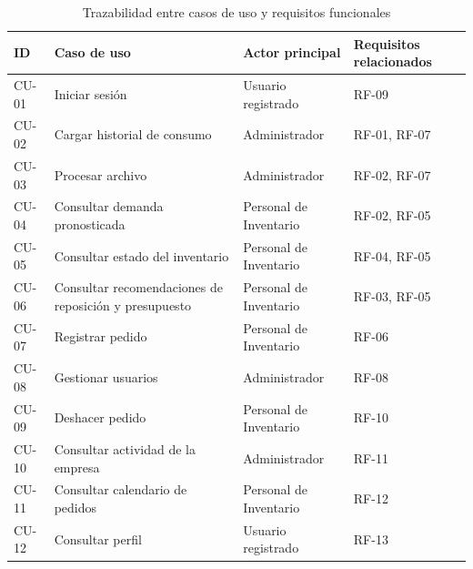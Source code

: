 \begin{table}[H]
\centering
\caption{Trazabilidad entre casos de uso y requisitos funcionales}
\label{tab:trazabilidad_casos_uso}
\begin{tabularx}{\textwidth}{>{\centering\arraybackslash}p{1.2cm} >{\raggedright\arraybackslash}X >{\raggedright\arraybackslash}X >{\centering\arraybackslash}p{3cm}}
\hline
\textbf{ID} & \textbf{Caso de uso} & \textbf{Actor principal} & \textbf{Requisitos relacionados} \\
\hline

CU-01 & Iniciar sesión & Usuario registrado & RF-09 \\

CU-02 & Cargar historial de consumo & Administrador & RF-01, RF-07 \\

CU-03 & Procesar archivo & Administrador & RF-02, RF-07 \\

CU-04 & Consultar demanda pronosticada & Personal de Inventario & RF-02, RF-05 \\

CU-05 & Consultar estado del inventario & Personal de Inventario & RF-04, RF-05 \\

CU-06 & Consultar recomendaciones de reposición y presupuesto & Personal de Inventario & RF-03, RF-05 \\

CU-07 & Registrar pedido & Personal de Inventario & RF-06 \\

CU-08 & Gestionar usuarios & Administrador & RF-08 \\

CU-09 & Deshacer pedido & Personal de Inventario & RF-10 \\

CU-10 & Consultar actividad de la empresa & Administrador & RF-11 \\

CU-11 & Consultar calendario de pedidos & Personal de Inventario & RF-12 \\

CU-12 & Consultar perfil & Usuario registrado & RF-13 \\

\hline
\end{tabularx}
\end{table}


